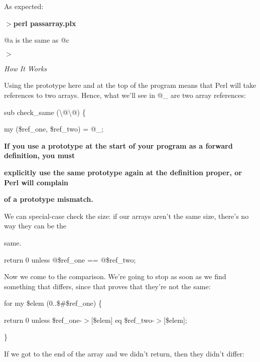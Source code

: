 \documentclass[a4paper,11pt]{book}
\begin{document}
\noindent As expected:

\noindent 

\noindent $>$\textbf{perl passarray.plx}

\noindent @a is the same as @c

\noindent $>$

\noindent 

\noindent 

\noindent \textit{How It Works}

\noindent Using the prototype here and at the top of the program means that Perl will take references to two arrays. Hence, what we'll see in @\_ are two array references:

\noindent 

\noindent sub check\_same (\textbackslash @\textbackslash @) \{

\noindent my (\$ref\_one, \$ref\_two) = @\_;

\noindent 

\noindent 

\noindent 

\noindent \textbf{If you use a prototype at the start of your program as a forward definition, you must}

\noindent \textbf{explicitly use the same prototype again at the definition proper, or Perl will complain}

\noindent \textbf{of a prototype mismatch.}

\noindent 

\noindent 

\noindent We can special-case check the  size:  if  our  arrays  aren't  the same  size,  there's  no  way they  can  be  the

\noindent same.

\noindent 

\noindent return 0 unless @\$ref\_one == @\$ref\_two;

\noindent 

\noindent Now we come to the comparison. We're going to stop as soon as we find something that differs, since that proves that they're not the same:

\noindent 

\noindent for my \$elem (0..\$\#\$ref\_one) \{

\noindent return 0 unless \$ref\_one-$>$[\$elem] eq \$ref\_two-$>$[\$elem];

\noindent \}

\noindent 

\noindent If we got to the end of the array and we didn't return, then they didn't differ:
\end{document}
